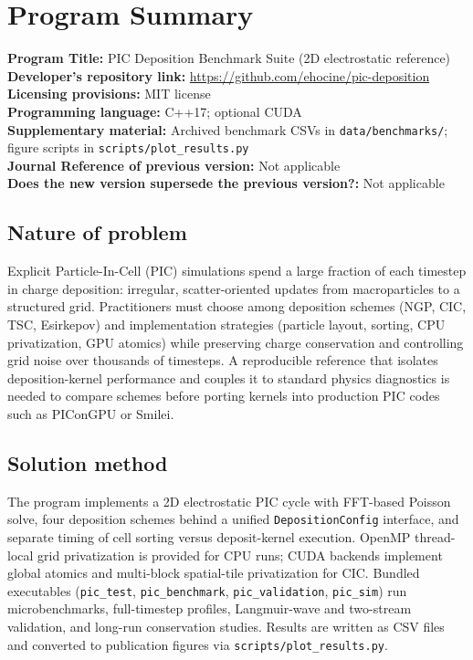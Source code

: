 \section*{Program Summary}

\noindent\textbf{Program Title:} PIC Deposition Benchmark Suite (2D electrostatic reference)\\
\textbf{Developer's repository link:} \url{https://github.com/ehocine/pic-deposition}\\
\textbf{Licensing provisions:} MIT license\\
\textbf{Programming language:} C++17; optional CUDA\\
\textbf{Supplementary material:} Archived benchmark CSVs in \texttt{data/benchmarks/}; figure scripts in \texttt{scripts/plot\_results.py}\\
\textbf{Journal Reference of previous version:} Not applicable\\
\textbf{Does the new version supersede the previous version?:} Not applicable

\subsection*{Nature of problem}
Explicit Particle-In-Cell (PIC) simulations spend a large fraction of each timestep in charge deposition: irregular, scatter-oriented updates from macroparticles to a structured grid.
Practitioners must choose among deposition schemes (NGP, CIC, TSC, Esirkepov) and implementation strategies (particle layout, sorting, CPU privatization, GPU atomics) while preserving charge conservation and controlling grid noise over thousands of timesteps.
A reproducible reference that isolates deposition-kernel performance and couples it to standard physics diagnostics is needed to compare schemes before porting kernels into production PIC codes such as PIConGPU or Smilei.

\subsection*{Solution method}
The program implements a 2D electrostatic PIC cycle with FFT-based Poisson solve, four deposition schemes behind a unified \texttt{DepositionConfig} interface, and separate timing of cell sorting versus deposit-kernel execution.
OpenMP thread-local grid privatization is provided for CPU runs; CUDA backends implement global atomics and multi-block spatial-tile privatization for CIC.
Bundled executables (\texttt{pic\_test}, \texttt{pic\_benchmark}, \texttt{pic\_validation}, \texttt{pic\_sim}) run microbenchmarks, full-timestep profiles, Langmuir-wave and two-stream validation, and long-run conservation studies.
Results are written as CSV files and converted to publication figures via \texttt{scripts/plot\_results.py}.

